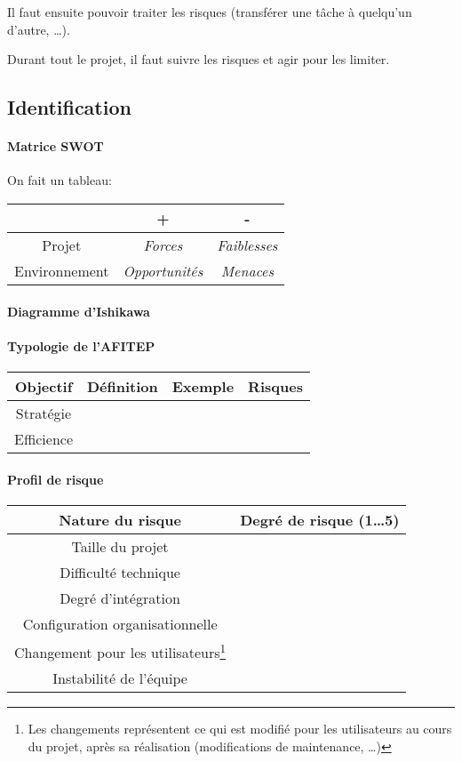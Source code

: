 \documentclass[10pt,a4paper,french]{article}
\begin{document}
Il faut ensuite pouvoir traiter les risques (transférer une tâche à quelqu'un d'autre, \dots).

Durant tout le projet, il faut suivre les risques et agir pour les limiter.

\subsection{Identification}

\paragraph{Matrice SWOT}
On fait un tableau:
\begin{tabular}{c|cc}
& + & - \\
\hline
Projet & \textit{Forces} & \textit{Faiblesses} \\
Environnement & \textit{Opportunités} & \textit{Menaces}
\end{tabular}

\paragraph{Diagramme d'Ishikawa}

\paragraph{Typologie de l'AFITEP}
\begin{tabular}{c|ccc}
Objectif & Définition & Exemple & Risques \\
\hline
Stratégie & & & \\
Efficience & & &
\end{tabular}

\paragraph{Profil de risque}
\begin{tabular}{c|c}
Nature du risque & Degré de risque (1\ldots 5) \\
\hline
Taille du projet & \\
Difficulté technique & \\
Degré d'intégration & \\
Configuration organisationnelle & \\
Changement pour les utilisateurs\footnote{Les changements représentent ce qui est modifié pour les utilisateurs au cours du projet, après sa réalisation (modifications de maintenance, \ldots)} & \\
Instabilité de l'équipe & \\
\end{tabular}
\end{document}
